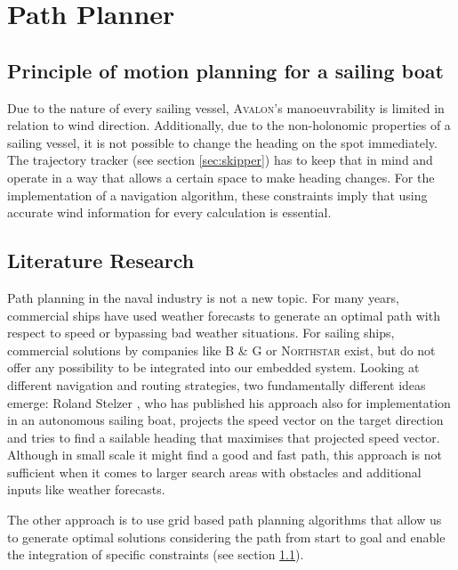 \section{Path Planner} \label{sec:navigator}
\subsection{Principle of motion planning for a sailing boat} \label{sec:intro_principle}
Due to the nature of every sailing vessel, \textsc{Avalon}'s manoeuvrability is
limited in relation to wind direction. Additionally, due to the non-holonomic
properties of a sailing vessel, it is not possible to change the heading on the
spot immediately.  The trajectory tracker (see section \ref{sec:skipper}) has
to keep that in mind and operate in a way that allows a certain space to make
heading changes. For the implementation of a navigation algorithm, these
constraints imply that using accurate wind information for every calculation is
essential.
 
\subsection{Literature Research}
%
Path planning in the naval industry is not a new topic. For many years,
commercial ships have used weather forecasts to generate an optimal path with
respect to speed or bypassing bad weather situations. For sailing ships,
commercial solutions by companies like \textsc{B \& G} or \textsc{Northstar}
exist, but do not offer any possibility to be integrated into our embedded
system. Looking at different navigation and routing strategies, two
fundamentally different ideas emerge: Roland Stelzer \cite{stelzer2008}, who
has published his approach also for implementation in an autonomous sailing
boat, projects the speed vector on the target direction and tries to find a
sailable heading that maximises that projected speed vector. Although in small
scale it might find a good and fast path, this approach is not sufficient when
it comes to larger search areas with obstacles and additional inputs like
weather forecasts.

The other approach is to use grid based path planning algorithms that allow us
to generate optimal solutions considering the path from start to goal and
enable the integration of specific constraints (see section
\ref{sec:intro_principle}).

